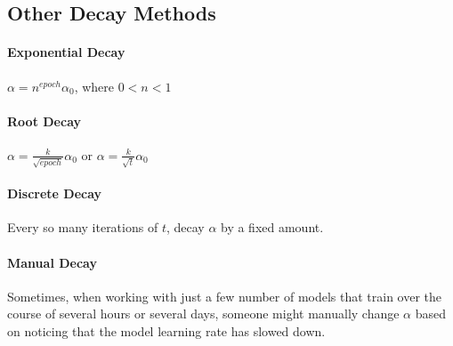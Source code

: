 \documentclass{article}
\begin{document}
\subsection{Other Decay Methods}

\paragraph{Exponential Decay}

$\alpha = n^{epoch} \alpha_0$, where $0 < n < 1$

\paragraph{Root Decay}

$\alpha = \frac{k}{\sqrt{epoch}} \alpha_0$ or $\alpha = \frac{k}{\sqrt{t}} \alpha_0$

\paragraph{Discrete Decay}

Every so many iterations of $t$, decay $\alpha$ by a fixed amount.

\paragraph{Manual Decay}

Sometimes, when working with just a few number of models that train over the course of several hours or several days, someone might manually change $\alpha$ based on noticing that the model learning rate has slowed down.
\end{document}
